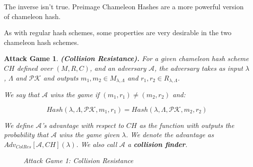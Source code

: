 \documentclass[a4paper]{article}
\newtheorem{game}{Attack Game}
\begin{document}
    The inverse isn't true. Preimage Chameleon Hashes are a more powerful
    version of chameleon hash.
    
    As with regular hash schemes, some properties are very desirable in 
    the two chameleon hash schemes.
    
    \begin{game}
    \textbf{(Collision Resistance).} For a given chameleon hash scheme $CH$ defined
    over $(M, R, C)$, and an adversary $\mathcal{A}$,
    the adversary takes as input $\lambda$, $\Lambda$ and $\mathcal{PK}$ and
    outputs $m_1, m_2 \in M_{\lambda,\Lambda}$ and
    $r_1, r_2 \in R_{\lambda,\Lambda}$.
    
    We say that $\mathcal{A}$ wins the game if $(m_1, r_1) \neq (m_2, r_2)$ and:
    
    $$
    Hash(\lambda, \Lambda, \mathcal{PK}, m_1, r_1)=
    Hash(\lambda,\Lambda,\mathcal{PK}, m_2, r_2)
    $$
    
    We define $\mathcal{A}$'s advantage with respect to $CH$ as the
    function with outputs the probability that $\mathcal{A}$ wins the game
    given $\lambda$. We denote the advantage as
    $Adv_{ColRes}[\mathcal{A},CH](\lambda)$. We also call $\mathcal{A}$ a
    \textbf{collision finder}.
    
    \begin{figure}
      \centering
      \caption{Attack Game 1: Collision Resistance}
    \end{figure}
    \end{game}
    
\end{document}
